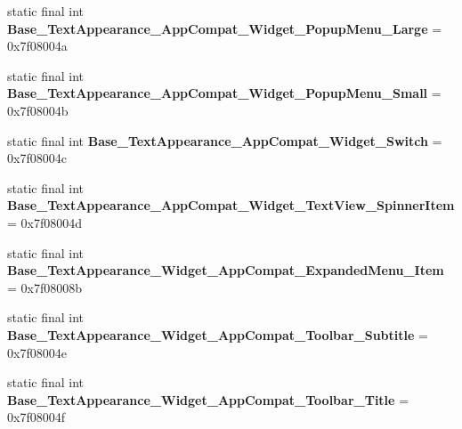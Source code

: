 \begin{DoxyCompactItemize}
\item 
\hypertarget{classandroid_1_1support_1_1v7_1_1appcompat_1_1_r_1_1style_acec204e57bed4bc07073071d0a8a42dd}{}static final int {\bfseries Base\+\_\+\+Text\+Appearance\+\_\+\+App\+Compat\+\_\+\+Widget\+\_\+\+Popup\+Menu\+\_\+\+Large} = 0x7f08004a\label{classandroid_1_1support_1_1v7_1_1appcompat_1_1_r_1_1style_acec204e57bed4bc07073071d0a8a42dd}

\item 
\hypertarget{classandroid_1_1support_1_1v7_1_1appcompat_1_1_r_1_1style_ad6af5d6b56317b8ec58f539b1888a924}{}static final int {\bfseries Base\+\_\+\+Text\+Appearance\+\_\+\+App\+Compat\+\_\+\+Widget\+\_\+\+Popup\+Menu\+\_\+\+Small} = 0x7f08004b\label{classandroid_1_1support_1_1v7_1_1appcompat_1_1_r_1_1style_ad6af5d6b56317b8ec58f539b1888a924}

\item 
\hypertarget{classandroid_1_1support_1_1v7_1_1appcompat_1_1_r_1_1style_a51725e1cbcc9c36e3ad88184aea4b38a}{}static final int {\bfseries Base\+\_\+\+Text\+Appearance\+\_\+\+App\+Compat\+\_\+\+Widget\+\_\+\+Switch} = 0x7f08004c\label{classandroid_1_1support_1_1v7_1_1appcompat_1_1_r_1_1style_a51725e1cbcc9c36e3ad88184aea4b38a}

\item 
\hypertarget{classandroid_1_1support_1_1v7_1_1appcompat_1_1_r_1_1style_ab9e96eae581adf2eb8614bbda6ac7394}{}static final int {\bfseries Base\+\_\+\+Text\+Appearance\+\_\+\+App\+Compat\+\_\+\+Widget\+\_\+\+Text\+View\+\_\+\+Spinner\+Item} = 0x7f08004d\label{classandroid_1_1support_1_1v7_1_1appcompat_1_1_r_1_1style_ab9e96eae581adf2eb8614bbda6ac7394}

\item 
\hypertarget{classandroid_1_1support_1_1v7_1_1appcompat_1_1_r_1_1style_ae7658a7cd5c3425ebc9aa6bbb54a6a45}{}static final int {\bfseries Base\+\_\+\+Text\+Appearance\+\_\+\+Widget\+\_\+\+App\+Compat\+\_\+\+Expanded\+Menu\+\_\+\+Item} = 0x7f08008b\label{classandroid_1_1support_1_1v7_1_1appcompat_1_1_r_1_1style_ae7658a7cd5c3425ebc9aa6bbb54a6a45}

\item 
\hypertarget{classandroid_1_1support_1_1v7_1_1appcompat_1_1_r_1_1style_ac64a505ec7328631cc1a2fe22d9c778a}{}static final int {\bfseries Base\+\_\+\+Text\+Appearance\+\_\+\+Widget\+\_\+\+App\+Compat\+\_\+\+Toolbar\+\_\+\+Subtitle} = 0x7f08004e\label{classandroid_1_1support_1_1v7_1_1appcompat_1_1_r_1_1style_ac64a505ec7328631cc1a2fe22d9c778a}

\item 
\hypertarget{classandroid_1_1support_1_1v7_1_1appcompat_1_1_r_1_1style_afc0aa5f87799755400758b40a2ea23b1}{}static final int {\bfseries Base\+\_\+\+Text\+Appearance\+\_\+\+Widget\+\_\+\+App\+Compat\+\_\+\+Toolbar\+\_\+\+Title} = 0x7f08004f\label{classandroid_1_1support_1_1v7_1_1appcompat_1_1_r_1_1style_afc0aa5f87799755400758b40a2ea23b1}


\end{DoxyCompactItemize}
